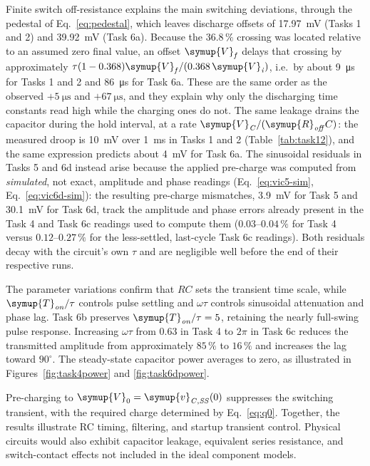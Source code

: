 \documentclass[12pt,a4paper]{article}
\begin{document}
	Finite switch off-resistance explains the main switching deviations,
	through the pedestal of Eq.~\eqref{eq:pedestal}, which leaves
	discharge offsets of \SI{17.97}{\milli\volt} (Tasks 1 and 2) and
	\SI{39.92}{\milli\volt} (Task 6a).  Because the $36.8\,\%$ crossing
	was located relative to an assumed zero final value, an offset
	$\symup{V}_{\mathit{f}}$ delays that crossing by approximately
	$\tau(1-0.368)\symup{V}_{\mathit{f}}/(0.368\,\symup{V}_{\mathit{i}})$, i.e.\ by about
	\SI{9}{\micro\second} for Tasks 1 and 2 and \SI{86}{\micro\second} for
	Task 6a.  These are the same order as the observed
	$+\SI{5}{\micro\second}$ and $+\SI{67}{\micro\second}$, and they explain
	why only the discharging time constants read high while the charging
	ones do not.  The same leakage drains the capacitor during the hold
	interval, at a rate $\symup{V}_{\mathit{C}}/(\symup{R}_{\mathit{off}}C)$: the measured
	droop is \SI{10}{\milli\volt} over \SI{1}{\milli\second} in Tasks 1 and
	2 (Table~\ref{tab:task12}), and the same expression predicts about
	\SI{4}{\milli\volt} for Task 6a.  The sinusoidal residuals in
	Tasks 5 and 6d instead arise because the applied pre-charge was
	computed from \emph{simulated}, not exact, amplitude and phase
	readings (Eq.~\eqref{eq:vic5-sim}, Eq.~\eqref{eq:vic6d-sim}): the
	resulting pre-charge mismatches, \SI{3.9}{\milli\volt} for Task 5
	and \SI{30.1}{\milli\volt} for Task 6d, track the amplitude and
	phase errors already present in the Task 4 and Task 6c readings
	used to compute them ($0.03$--$0.04\,\%$ for Task 4 versus
	$0.12$--$0.27\,\%$ for the less-settled, last-cycle Task 6c
	readings).  Both residuals decay with the circuit's own $\tau$ and
	are negligible well before the end of their respective runs.
	
	The parameter variations confirm that $RC$ sets the transient time
	scale, while $\symup{T}_{\mathit{on}}/\tau$ controls pulse settling and $\omega\tau$
	controls sinusoidal attenuation and phase lag.  Task 6b preserves
	$\symup{T}_{\mathit{on}}/\tau=5$, retaining the nearly full-swing pulse response.
	Increasing $\omega\tau$ from $0.63$ in Task 4 to $2\pi$ in Task 6c
	reduces the transmitted amplitude from approximately $85\,\%$ to
	$16\,\%$ and increases the lag toward $90^\circ$.
	The steady-state capacitor power averages to zero, as illustrated
	in Figures~\ref{fig:task4power} and \ref{fig:task6dpower}.
	
	Pre-charging to $\symup{V}_{0}=\symup{v}_{\mathit{C,SS}}(0)$ suppresses the switching
	transient, with the required charge determined by Eq.~\eqref{eq:q0}.
	Together, the results illustrate RC timing, filtering, and startup
	transient control.  Physical circuits would also exhibit capacitor
	leakage, equivalent series resistance, and switch-contact effects
	not included in the ideal component models.
	
\end{document}
